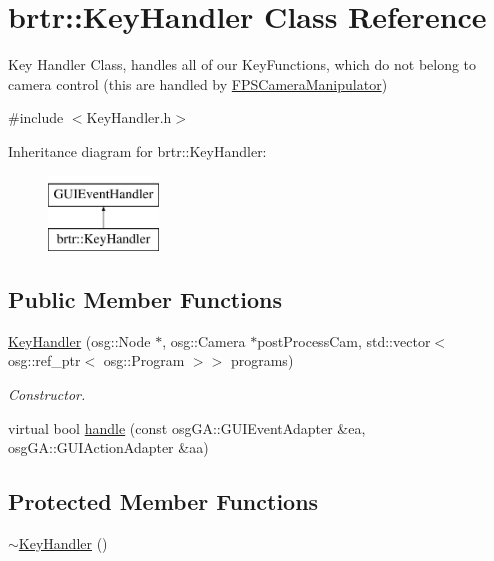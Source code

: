 \hypertarget{classbrtr_1_1_key_handler}{\section{brtr\+:\+:Key\+Handler Class Reference}
\label{classbrtr_1_1_key_handler}
}


Key Handler Class, handles all of our Key\+Functions, which do not belong to camera control (this are handled by \hyperlink{classbrtr_1_1_f_p_s_camera_manipulator}{F\+P\+S\+Camera\+Manipulator})  




{\ttfamily \#include $<$Key\+Handler.\+h$>$}

Inheritance diagram for brtr\+:\+:Key\+Handler\+:\begin{figure}[H]
\begin{center}
\leavevmode
\includegraphics[height=2.000000cm]{classbrtr_1_1_key_handler}
\end{center}
\end{figure}
\subsection*{Public Member Functions}
\begin{DoxyCompactItemize}
\item 
\hyperlink{classbrtr_1_1_key_handler_aaae067fabc959780a9fae9c700c199da}{Key\+Handler} (osg\+::\+Node $\ast$, osg\+::\+Camera $\ast$post\+Process\+Cam, std\+::vector$<$ osg\+::ref\+\_\+ptr$<$ osg\+::\+Program $>$$>$ programs)
\begin{DoxyCompactList}\small\item\em Constructor. \end{DoxyCompactList}\item 
virtual bool \hyperlink{classbrtr_1_1_key_handler_a02df9f4339712d5b8b2b25b89048cf47}{handle} (const osg\+G\+A\+::\+G\+U\+I\+Event\+Adapter \&ea, osg\+G\+A\+::\+G\+U\+I\+Action\+Adapter \&aa)
\end{DoxyCompactItemize}
\subsection*{Protected Member Functions}
\begin{DoxyCompactItemize}
\item 
\hyperlink{classbrtr_1_1_key_handler_aabad0b142ba1d2e648069b4e8af17797}{$\sim$\+Key\+Handler} ()
\end{DoxyCompactItemize}
